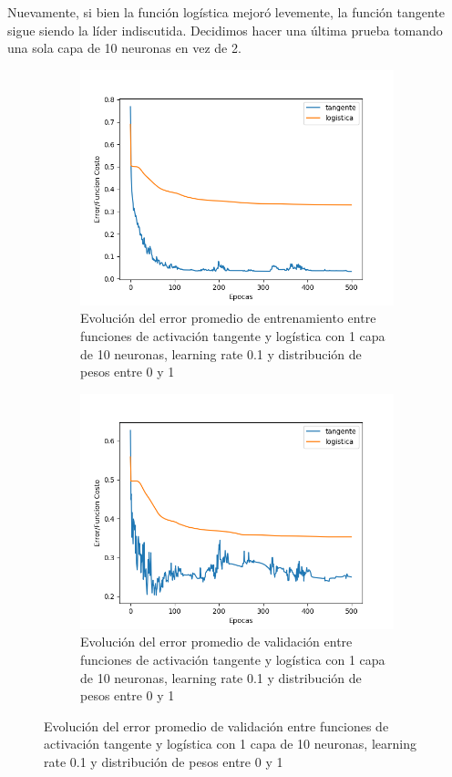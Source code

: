 Nuevamente, si bien la función logística mejoró levemente, la función tangente sigue siendo la líder indiscutida. Decidimos hacer una última prueba 
tomando una sola capa de 10 neuronas en vez de 2.

\begin{figure}[!htbp]
\centering
\begin{subfigure}{.5\textwidth}
  \centering
  \includegraphics[width=1\linewidth]{graficos/factivaciones_promedios_entrenamiento.png}
  \caption{Evolución del error promedio de entrenamiento entre funciones de activación tangente y logística con 1 capa de 10 neuronas, learning rate 0.1 y distribución de pesos entre 0 y 1}
  \label{fig:sub1}
\end{subfigure}%
\begin{subfigure}{.5\textwidth}
  \centering
  \includegraphics[width=1\linewidth]{graficos/factivaciones_promedios_validacion.png}
  \caption{Evolución del error promedio de validación entre funciones de activación tangente y logística con 1 capa de 10 neuronas, learning rate 0.1 y distribución de pesos entre 0 y 1}
  \label{fig:sub2}
\end{subfigure}
\end{figure}

